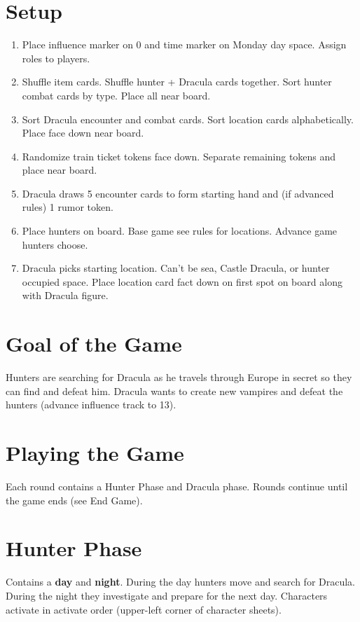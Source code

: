 \documentclass[12pt]{article}
\newenvironment{enumerateCustom}
{\begin{enumerate}
  \setlength{\itemsep}{1pt}
  \setlength{\parskip}{0pt}
  \setlength{\parsep}{0pt}}
{\end{enumerate}}
\begin{document}
\begin{multicols*}{2}

\section*{Setup}
    \begin{enumerateCustom}
        \item Place influence marker on 0 and time marker on Monday day space. Assign roles to players.
        \item Shuffle item cards. Shuffle hunter + Dracula cards together. Sort hunter combat cards by type. Place all near board.
        \item Sort Dracula encounter and combat cards. Sort location cards alphabetically. Place face down near board.
        \item Randomize train ticket tokens face down. Separate remaining tokens and place near board.
        \item Dracula draws 5 encounter cards to form starting hand and (if advanced rules) 1 rumor token.
        \item Place hunters on board. Base game see rules for locations. Advance game hunters choose.
        \item Dracula picks starting location. Can't be sea, Castle Dracula, or hunter occupied space. Place location card fact down on first spot on board along with Dracula figure.
    \end{enumerateCustom}
\section*{Goal of the Game}
Hunters are searching for Dracula as he travels through Europe in secret so they can find and defeat him. Dracula wants to create new vampires and defeat the hunters (advance influence track to 13). 

\section*{Playing the Game}
Each round contains a Hunter Phase and Dracula phase. Rounds continue until the game ends (see End Game).

\section*{Hunter Phase}
Contains a \textbf{day} and \textbf{night}. During the day hunters move and search for Dracula. During the night they investigate and prepare for the next day. Characters activate in activate order (upper-left corner of character sheets).

\end{multicols*}
\end{document}
